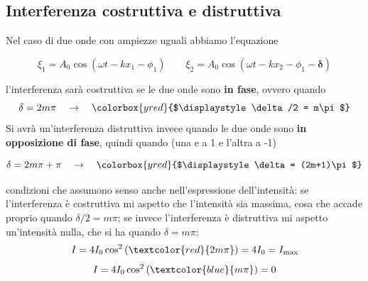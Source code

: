 \documentclass[x11names]{report}
\newcommand{\viola}[1]{\colorbox{yred}{$\displaystyle #1$}}
\begin{document}
	\begin{es}{}
		\subsection{Interferenza costruttiva e distruttiva}
		Nel caso di due onde con ampiezze uguali abbiamo l'equazione 
		
		\[ 
		\xi_1 = A_0\cos\left(\omega t - kx_1 - \phi_1\right)
		\qquad
		\xi_2 = A_0\cos\left(\omega t - kx_2 - \phi_1 - \boldsymbol{\delta}\right)
		\] 
		
		l'interferenza sarà costruttiva se le due onde sono \textbf{in fase}, ovvero quando 
		\[ 
		\delta = 2m\pi \quad \to \quad \viola{\delta/2 = m\pi }
		\]
		Si avrà un'interferenza distruttiva invece quando le due onde sono \textbf{in opposizione di fase}, quindi quando (una e a 1 e l'altra a -1)
		
		\[ 
		\delta = 2m\pi + \pi \quad \to \quad \viola{\delta = (2m+1)\pi }
		\]
		
		condizioni che assumono senso anche nell'espressione dell'intensità: se l'interferenza è costruttiva mi aspetto che l'intensità sia massima, cosa che accade proprio quando  \(\delta/2 = m\pi \); se invece l'interferenza è distruttiva mi aspetto un'intensità nulla, che si ha quando \(\delta = m\pi \):
		\[ 
		I = 4I_0 \cos^2\left(\textcolor{red}{2m\pi }\right) = 4I_0 = I_\text{max}
		\]
		\[ 
		I = 4I_0 \cos^2\left(\textcolor{blue}{m\pi }\right) = 0 
		\]
	\end{es}
%	
%	
%	
\end{document}
